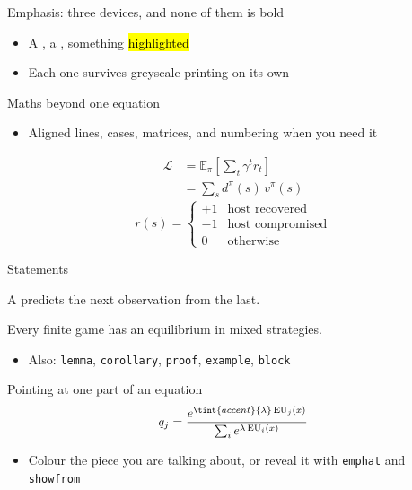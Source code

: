 \documentclass[11pt,aspectratio=43]{beamer}
\newcommand{\howto}[1]{}
\begin{document}
\begin{frame}{Emphasis: three devices, and none of them is bold}
  \begin{itemize}
    \item A , a , something \hl{highlighted}
    \item Each one survives greyscale printing on its own
  \end{itemize}
  \howto{emphasis}
\end{frame}

\begin{frame}[allowframebreaks]{Maths beyond one equation}
  \begin{itemize}
    \item Aligned lines, cases, matrices, and numbering when you need it
  \end{itemize}
  \begin{align*}
    \mathcal{L} &= \mathbb{E}_{\pi}\left[ \sum_t \gamma^t r_t \right] \\
                &= \sum_s d^{\pi}(s)\, v^{\pi}(s)
  \end{align*}
  \[ r(s) = \begin{cases}
       +1 & \text{host recovered} \\
       -1 & \text{host compromised} \\
        0 & \text{otherwise}
     \end{cases} \]
  \howto{math}
\end{frame}

\begin{frame}{Statements}
  \begin{definition}
    A  predicts the next observation from the last.
  \end{definition}
  \begin{theorem}[Nash, 1951]
    Every finite game has an equilibrium in mixed strategies.
  \end{theorem}
  \begin{itemize}
    \item Also: \texttt{lemma}, \texttt{corollary}, \texttt{proof},
      \texttt{example}, \texttt{block}
  \end{itemize}
\end{frame}

\begin{frame}{Pointing at one part of an equation}
  \[ q_j = \frac{e^{\tint{accent}{\lambda}\, \mathrm{EU}_j(x)}}
                {\sum_i e^{\lambda\, \mathrm{EU}_i(x)}} \]
  \begin{itemize}
    \item Colour the piece you are talking about, or reveal it with
      \texttt{emphat} and \texttt{showfrom}
  \end{itemize}
\end{frame}
\end{document}
